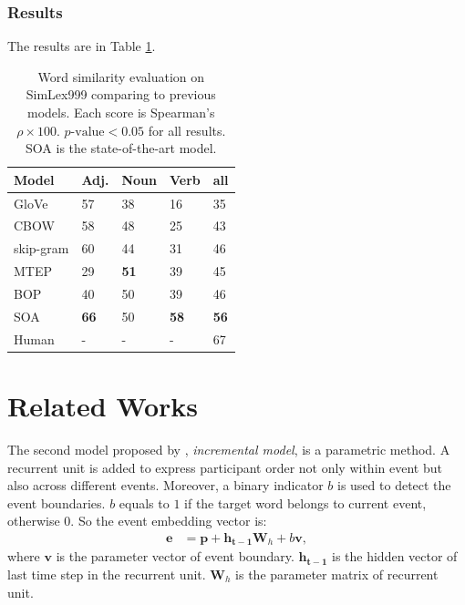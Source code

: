\documentclass[a4paper]{article}
\begin{document}
\subsubsection{Results} \label{sec:result-wordsim}
The results are in Table \ref{tab:wordsim}. 
\begin{table}[t]
\centering
\begin{tabular}{l||l|l|l|l}
\textbf{Model}  &   Adj.&   Noun    &   Verb    &   all \\ \hline
GloVe       &       57  &   38      &   16      &   35  \\
CBOW        &       58  &   48      &   25      &   43  \\
skip-gram   &       60  &   44      &   31      &   46  \\ \hline
MTEP        &       29  & \textbf{51} & 39      &   45  \\
BOP         &       40  &   50      &   39      &   46  \\ \hline
SOA         & \textbf{66} & 50  & \textbf{58} & \textbf{56} \\
Human       &       -   &   -       &   -       &   67  \\
\end{tabular}
\caption{\label{tab:wordsim} Word similarity evaluation on SimLex999 comparing to previous models. Each score is Spearman's $\rho \times 100$. $p\text{-value} < 0.05$ for all results. SOA is the state-of-the-art model. }
\end{table}





\section{Related Works}
The second model proposed by \citet{tilk2016event}, \textit{incremental model}, is a parametric method. A recurrent unit is added to express participant order not only within event but also across different events. Moreover, a binary indicator $b$ is used to detect the event boundaries. $b$ equals to $1$ if the target word belongs to current event, otherwise $0$. So the event embedding vector is: 
\begin{equation} \label{eq:incremental}
\begin{aligned}
    \mathbf{e} 
        &= \mathbf{p} + \mathbf{h_{t-1}}\mathbf{W}_h + b\mathbf{v}, 
\end{aligned}
\end{equation}
where $\mathbf{v}$ is the parameter vector of event boundary. $\mathbf{h_{t-1}}$ is the hidden vector of last time step in the recurrent unit. $\mathbf{W}_h$ is the parameter matrix of recurrent unit. 
\end{document}
